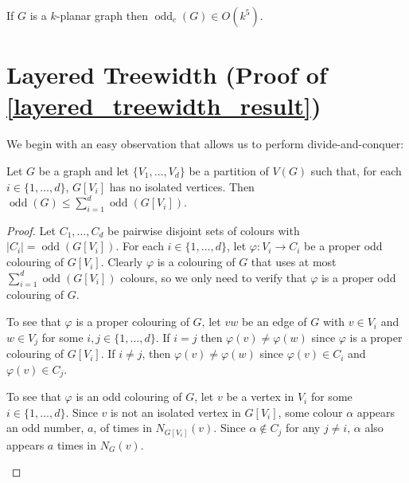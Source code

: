 \documentclass{patmorin}
\DeclareMathOperator{\odd}{odd}
\newcommand{\oddc}{\odd_c}
\begin{document}
\begin{cor}\label{k_planar_choice}
  If $G$ is a $k$-planar graph then $\oddc(G)\in O(k^5)$.
\end{cor}


% 
% 
% 
% 

\section{Layered Treewidth (Proof of \cref{layered_treewidth_result})}
\label{layered_treewidth}

We begin with an easy observation that allows us to perform divide-and-conquer:

\begin{obs}\label{partition}
  Let $G$ be a graph and let $\{V_1,\ldots,V_d\}$ be a partition of $V(G)$ such that, for each $i\in\{1,\ldots,d\}$, $G[V_i]$ has no isolated vertices.  Then $\odd(G) \le \sum_{i=1}^d \odd(G[V_i])$.
\end{obs}

\begin{proof}
  Let $C_1,\ldots,C_d$ be pairwise disjoint sets of colours with $|C_i|=\odd(G[V_i])$.  For each $i\in\{1,\ldots,d\}$, let $\varphi:V_i\to C_i$ be a proper odd colouring of $G[V_i]$.  Clearly $\varphi$ is a colouring of $G$ that uses at most $\sum_{i=1}^d \odd(G[V_i])$ colours, so we only need to verify that $\varphi$ is a proper odd colouring of $G$.
  \begin{compactitem}
    \item To see that $\varphi$ is a proper colouring of $G$, let $vw$ be an edge of $G$ with $v\in V_i$ and $w\in V_j$ for some $i,j\in\{1,\ldots,d\}$. If $i=j$ then $\varphi(v)\neq\varphi(w)$ since $\varphi$ is a proper colouring of $G[V_i]$.  If $i\neq j$, then $\varphi(v)\neq\varphi(w)$ since $\varphi(v)\in C_i$ and $\varphi(v)\in C_j$.

    \item To see that $\varphi$ is an odd colouring of $G$, let $v$ be a vertex in $V_i$ for some $i\in\{1,\ldots,d\}$.   Since $v$ is not an isolated vertex in $G[V_i]$, some colour $\alpha$ appears an odd number, $a$, of times in $N_{G[V_i]}(v)$.  Since $\alpha\not\in C_j$ for any $j\neq i$, $\alpha$ also appears $a$ times in $N_G(v)$. \qedhere
  \end{compactitem}
\end{proof}
\end{document}
